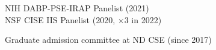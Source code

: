\documentclass[10pt]{article}
\newenvironment{myindentpar}[1]%
{\begin{list}{}%
         {\setlength{\leftmargin}{#1}}%
         \item[]%
}
{\end{list}}
\newcounter{list}
\begin{document}
\begin{myindentpar}{0.75cm}

\hspace{-0.75cm}{\bf Governmental Service}

{\small

\textcolor{white}{} NIH DABP-PSE-IRAP Panelist (2021) \\
\textcolor{white}{} NSF CISE IIS Panelist (2020, $\times 3$ in 2022)
}

\hspace{-0.75cm}{\bf Departmental Service}

{\small

\textcolor{white}{} Graduate admission committee at ND CSE (since 2017)
}

\hspace{-0.75cm}{\bf Ph.D. Dissertation Committee}

{\small

}
\end{myindentpar}
\end{document}
